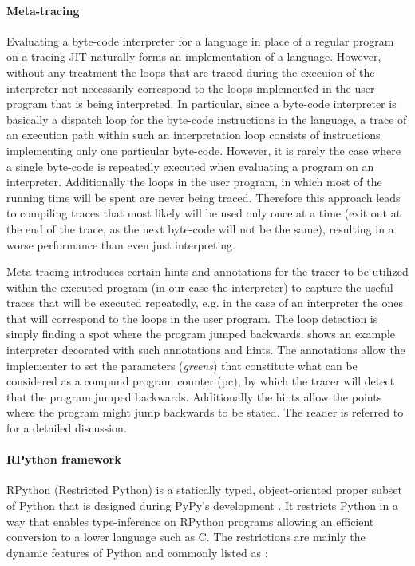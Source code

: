 \paragraph{Meta-tracing}
Evaluating a byte-code interpreter for a language in place of a
regular program on a tracing JIT naturally forms an implementation of
a language. However, without any treatment the loops that are traced
during the execuion of the interpreter not necessarily correspond to
the loops implemented in the user program that is being
interpreted. In particular, since a byte-code interpreter is basically
a dispatch loop for the byte-code instructions in the language, a
trace of an execution path within such an interpretation loop consists
of instructions implementing only one particular byte-code. However,
it is rarely the case where a single byte-code is repeatedly executed
when evaluating a program on an interpreter. Additionally the loops in
the user program, in which most of the running time will be spent are
never being traced. Therefore this approach leads to compiling traces
that most likely will be used only once at a time (exit out at the end
of the trace, as the next byte-code will not be the same), resulting
in a worse performance than even just interpreting.

Meta-tracing introduces certain hints and annotations for the tracer
to be utilized within the executed program (in our case the
interpreter) to capture the useful traces that will be executed
repeatedly, e.g. in the case of an interpreter the ones that will
correspond to the loops in the user program. The loop detection is
simply finding a spot where the program jumped
backwards.  shows an example interpreter
decorated with such annotations and hints. The annotations allow the
implementer to set the parameters (\emph{greens}) that constitute what
can be considered as a compund program counter (pc), by which the
tracer will detect that the program jumped backwards. Additionally the
hints allow the points where the program might jump backwards to be
stated.  The reader is referred to \cite{bolz09} for a detailed
discussion.

\paragraph{RPython framework}

RPython (Restricted Python) is a statically typed, object-oriented
proper subset of Python that is designed during PyPy's development
\cite{pypy06}. It restricts Python in a way that enables
type-inference on RPython programs allowing an efficient conversion to
a lower language such as C. The restrictions are mainly the dynamic
features of Python and commonly listed as \cite{rpython07,rpython09}:

